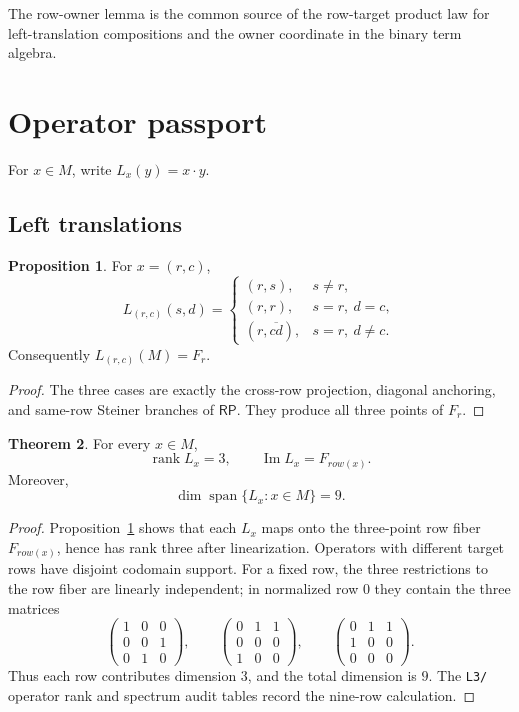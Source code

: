 \documentclass[11pt]{article}
\theoremstyle{definition}
\newtheorem{theorem}{Theorem}[section]
\newtheorem{proposition}[theorem]{Proposition}
\newcommand{\RP}{\mathsf{RP}}
\begin{document}
The row-owner lemma is the common source of the row-target product law for
left-translation compositions and the owner coordinate in the binary term
algebra.

\section{Operator passport}\label{left-regular-operators}

For \(x\in M\), write \(L_x(y)=x\cdot y\).

\subsection{Left translations}\label{row-fiber-normal-form}

\begin{proposition}
\label{prop:14.1}
For \(x=(r,c)\),
\[
L_{(r,c)}(s,d)=
\begin{cases}
(r,s), & s\ne r,\\[1mm]
(r,r), & s=r,\ d=c,\\[1mm]
(r,\overline{cd}), & s=r,\ d\ne c.
\end{cases}
\]
Consequently \(L_{(r,c)}(M)=F_r\).
\end{proposition}

\begin{proof}
The three cases are exactly the cross-row projection, diagonal anchoring,
and same-row Steiner branches of \(\RP\).  They produce all three points of
\(F_r\).
\end{proof}

\begin{theorem}
\label{thm:14.2}
For every \(x\in M\),
\[
\operatorname{rank}L_x=3,
\qquad
\operatorname{Im}L_x=F_{row(x)}.
\]
Moreover,
\[
\dim\operatorname{span}\{L_x:x\in M\}=9.
\]
\end{theorem}

\begin{proof}
Proposition~\ref{prop:14.1} shows that each \(L_x\) maps onto the
three-point row fiber \(F_{row(x)}\), hence has rank three after
linearization.  Operators with different target rows have disjoint
codomain support.  For a fixed row, the three restrictions to the row
fiber are linearly independent; in normalized row \(0\) they contain the
three matrices
\[
\begin{pmatrix}1&0&0\\0&0&1\\0&1&0\end{pmatrix},
\qquad
\begin{pmatrix}0&1&1\\0&0&0\\1&0&0\end{pmatrix},
\qquad
\begin{pmatrix}0&1&1\\1&0&0\\0&0&0\end{pmatrix}.
\]
Thus each row contributes dimension \(3\), and the total dimension is
\(9\).  The \texttt{L3/} operator rank and spectrum audit tables record the
nine-row calculation.
\end{proof}
\end{document}
